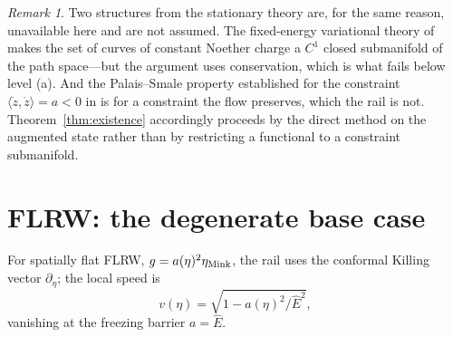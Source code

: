 \documentclass[12pt]{iopart}
\newcommand{\Ehat}{\hat E}
\theoremstyle{plain}
\theoremstyle{definition}
\theoremstyle{plain}
\theoremstyle{remark}
\newtheorem*{remark}{Remark}
\begin{document}
\begin{remark}
Two structures from the stationary theory are, for the same reason, unavailable
here and are not assumed. The fixed-energy variational theory of
\cite{CaponioCoronaGiamboPiccione2024} makes the set of curves of constant
Noether charge a $C^1$ closed submanifold of the path space---but the argument
uses conservation, which is what fails below level (a). And the Palais--Smale
property established for the constraint $\langle\dot z,\dot z\rangle=a<0$ in
\cite{GiannoniMasielloPiccione1998} is for a constraint the flow preserves, which
the rail is not. Theorem~\ref{thm:existence} accordingly proceeds by the direct
method on the augmented state rather than by restricting a functional to a
constraint submanifold.
\end{remark}


\section{FLRW: the degenerate base case}
\label{sec:flrw}
For spatially flat FLRW, $g=a(\eta)^2\eta_{\rm Mink}$, the rail uses the
conformal Killing vector $\partial_\eta$; the local speed is
\begin{equation}
    v(\eta)=\sqrt{1-a(\eta)^2/\Ehat^{2}},
    \label{eq:flrwspeed}
\end{equation}
vanishing at the freezing barrier $a=\Ehat$.
\end{document}
